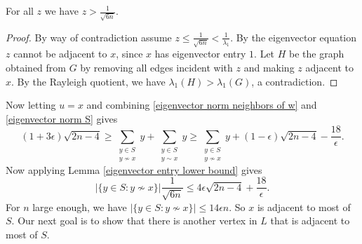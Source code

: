 \begin{lemma}\label{eigenvector entry lower bound}
For all $z$ we have $z>\frac{1}{\sqrt{6n}}$.
\end{lemma}
\begin{proof}
  By way of contradiction assume $z\leq \frac{1}{\sqrt{6n}} < \frac{1}{\lambda_1}$. By the eigenvector equation $z$ cannot be adjacent to $x$, since
  $x$ has eigenvector entry $1$. Let $H$ be the graph obtained from $G$ by removing all edges incident with $z$ and making $z$ adjacent to $x$. By the Rayleigh quotient, we have $\lambda_1(H) > \lambda_1(G)$, a contradiction.
\end{proof}

\noindent Now letting $u=x$ and combining \eqref{eigenvector norm neighbors of w} and \eqref{eigenvector norm S} gives 
\[
(1+3\epsilon)\sqrt{2n-4} \geq \sum_{\substack{y\in S\\ y\not\sim x}} y + \sum_{\substack{y\in S\\ y\sim x}} y \geq \sum_{\substack{y\in S\\ y\not\sim x}} y + (1-\epsilon)\sqrt{2n-4} - \frac{18}{\epsilon}.
\]
Now applying Lemma \ref{eigenvector entry lower bound} gives
\[
|\{y\in S: y\not\sim x\}| \frac{1}{\sqrt{6n} }\leq 4\epsilon \sqrt{2n-4} + \frac{18}{\epsilon}.
\]
For $n$ large enough, we have $|\{y\in S: y\not\sim x\}| \leq 14\epsilon n$. So $x$ is adjacent to most of $S$. Our next goal is to show that there is another vertex in $L$ that is adjacent to most of $S$.


